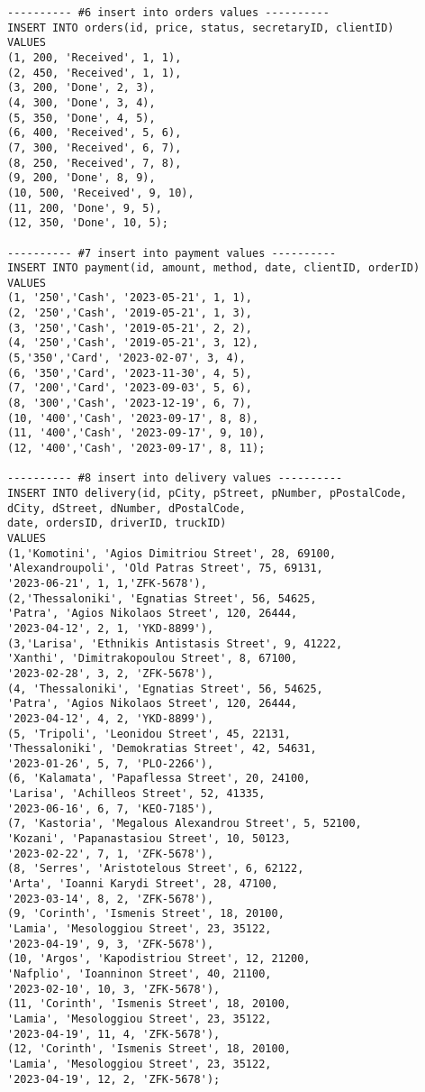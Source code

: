 \begin{lstlisting}
---------- #6 insert into orders values ----------
INSERT INTO orders(id, price, status, secretaryID, clientID)
VALUES
(1, 200, 'Received', 1, 1),
(2, 450, 'Received', 1, 1),
(3, 200, 'Done', 2, 3),
(4, 300, 'Done', 3, 4),
(5, 350, 'Done', 4, 5),
(6, 400, 'Received', 5, 6),
(7, 300, 'Received', 6, 7),
(8, 250, 'Received', 7, 8),
(9, 200, 'Done', 8, 9),
(10, 500, 'Received', 9, 10),
(11, 200, 'Done', 9, 5),
(12, 350, 'Done', 10, 5);

---------- #7 insert into payment values ----------
INSERT INTO payment(id, amount, method, date, clientID, orderID)
VALUES
(1, '250','Cash', '2023-05-21', 1, 1),
(2, '250','Cash', '2019-05-21', 1, 3),
(3, '250','Cash', '2019-05-21', 2, 2), 
(4, '250','Cash', '2019-05-21', 3, 12),
(5,'350','Card', '2023-02-07', 3, 4),
(6, '350','Card', '2023-11-30', 4, 5),
(7, '200','Card', '2023-09-03', 5, 6),
(8, '300','Cash', '2023-12-19', 6, 7),
(10, '400','Cash', '2023-09-17', 8, 8),
(11, '400','Cash', '2023-09-17', 9, 10),
(12, '400','Cash', '2023-09-17', 8, 11);

---------- #8 insert into delivery values ----------
INSERT INTO delivery(id, pCity, pStreet, pNumber, pPostalCode, 
dCity, dStreet, dNumber, dPostalCode, 
date, ordersID, driverID, truckID)
VALUES
(1,'Komotini', 'Agios Dimitriou Street', 28, 69100, 
'Alexandroupoli', 'Old Patras Street', 75, 69131, 
'2023-06-21', 1, 1,'ZFK-5678'),
(2,'Thessaloniki', 'Egnatias Street', 56, 54625, 
'Patra', 'Agios Nikolaos Street', 120, 26444, 
'2023-04-12', 2, 1, 'YKD-8899'),
(3,'Larisa', 'Ethnikis Antistasis Street', 9, 41222, 
'Xanthi', 'Dimitrakopoulou Street', 8, 67100, 
'2023-02-28', 3, 2, 'ZFK-5678'),
(4, 'Thessaloniki', 'Egnatias Street', 56, 54625, 
'Patra', 'Agios Nikolaos Street', 120, 26444, 
'2023-04-12', 4, 2, 'YKD-8899'),
(5, 'Tripoli', 'Leonidou Street', 45, 22131, 
'Thessaloniki', 'Demokratias Street', 42, 54631, 
'2023-01-26', 5, 7, 'PLO-2266'),
(6, 'Kalamata', 'Papaflessa Street', 20, 24100, 
'Larisa', 'Achilleos Street', 52, 41335, 
'2023-06-16', 6, 7, 'KEO-7185'),
(7, 'Kastoria', 'Megalous Alexandrou Street', 5, 52100, 
'Kozani', 'Papanastasiou Street', 10, 50123, 
'2023-02-22', 7, 1, 'ZFK-5678'),
(8, 'Serres', 'Aristotelous Street', 6, 62122, 
'Arta', 'Ioanni Karydi Street', 28, 47100, 
'2023-03-14', 8, 2, 'ZFK-5678'),
(9, 'Corinth', 'Ismenis Street', 18, 20100, 
'Lamia', 'Mesologgiou Street', 23, 35122, 
'2023-04-19', 9, 3, 'ZFK-5678'),
(10, 'Argos', 'Kapodistriou Street', 12, 21200, 
'Nafplio', 'Ioanninon Street', 40, 21100, 
'2023-02-10', 10, 3, 'ZFK-5678'),
(11, 'Corinth', 'Ismenis Street', 18, 20100, 
'Lamia', 'Mesologgiou Street', 23, 35122, 
'2023-04-19', 11, 4, 'ZFK-5678'),
(12, 'Corinth', 'Ismenis Street', 18, 20100, 
'Lamia', 'Mesologgiou Street', 23, 35122, 
'2023-04-19', 12, 2, 'ZFK-5678');


\end{lstlisting}
